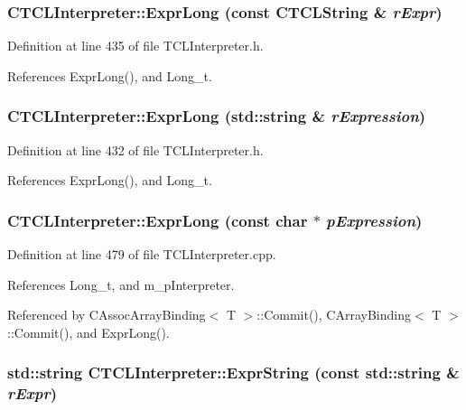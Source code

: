 \subsubsection{ CTCLInterpreter::Expr\-Long (const {\bf CTCLString} \& {\em r\-Expr})\hspace{0.3cm}{\tt  [inline]}}\label{classCTCLInterpreter_a22}




Definition at line 435 of file TCLInterpreter.h.

References Expr\-Long(), and Long\_\-t.
\subsubsection{ CTCLInterpreter::Expr\-Long (std::string \& {\em r\-Expression})\hspace{0.3cm}{\tt  [inline]}}\label{classCTCLInterpreter_a21}




Definition at line 432 of file TCLInterpreter.h.

References Expr\-Long(), and Long\_\-t.
\subsubsection{ CTCLInterpreter::Expr\-Long (const char $\ast$ {\em p\-Expression})}\label{classCTCLInterpreter_a20}




Definition at line 479 of file TCLInterpreter.cpp.

References Long\_\-t, and m\_\-p\-Interpreter.

Referenced by CAssoc\-Array\-Binding$<$ T $>$::Commit(), CArray\-Binding$<$ T $>$::Commit(), and Expr\-Long().
\subsubsection{\setlength{\rightskip}{0pt plus 5cm}std::string CTCLInterpreter::Expr\-String (const std::string \& {\em r\-Expr})\hspace{0.3cm}{\tt  [inline]}}\label{classCTCLInterpreter_a19}




